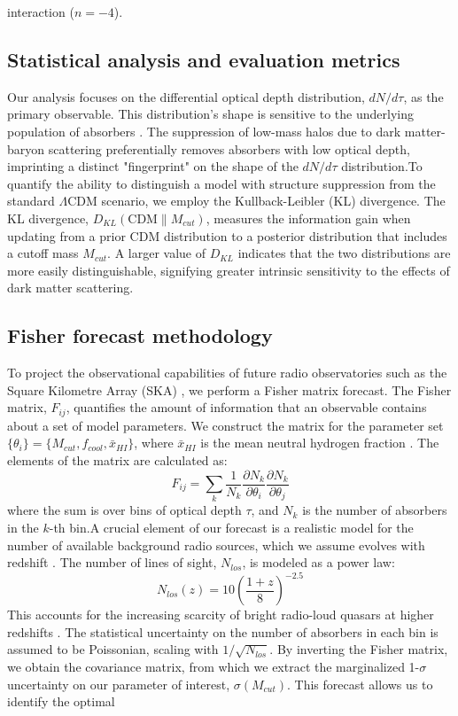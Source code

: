 \documentclass[]{article}
\begin{document}
interaction ($n=-4$).\subsection{Statistical analysis and evaluation metrics}Our analysis focuses on the differential optical depth distribution, $dN/d\tau$, as the primary observable. This distribution's shape is sensitive to the underlying population of absorbers \citep{kadota2023boosting21cmforest,ganguly2024edgesdarkforestnew}. The suppression of low-mass halos due to dark matter-baryon scattering preferentially removes absorbers with low optical depth, imprinting a distinct "fingerprint" on the shape of the $dN/d\tau$ distribution.To quantify the ability to distinguish a model with structure suppression from the standard $\Lambda$CDM scenario, we employ the Kullback-Leibler (KL) divergence. The KL divergence, $D_{KL}(\text{CDM} \parallel M_{cut})$, measures the information gain when updating from a prior CDM distribution to a posterior distribution that includes a cutoff mass $M_{cut}$. A larger value of $D_{KL}$ indicates that the two distributions are more easily distinguishable, signifying greater intrinsic sensitivity to the effects of dark matter scattering.\subsection{Fisher forecast methodology}To project the observational capabilities of future radio observatories such as the Square Kilometre Array (SKA) \citep{lazio2009squarekilometrearray,aharonian2013pathwaysquarekilometrearray}, we perform a Fisher matrix forecast. The Fisher matrix, $F_{ij}$, quantifies the amount of information that an observable contains about a set of model parameters. We construct the matrix for the parameter set $\{\theta_i\} = \{M_{cut}, f_{cool}, \bar{x}_{HI}\}$, where $\bar{x}_{HI}$ is the mean neutral hydrogen fraction \citep{li2025exploringhigalaxyredshift}. The elements of the matrix are calculated as:\begin{equation}F_{ij} = \sum_{k} \frac{1}{N_k} \frac{\partial N_k}{\partial \theta_i} \frac{\partial N_k}{\partial \theta_j}\end{equation}where the sum is over bins of optical depth $\tau$, and $N_k$ is the number of absorbers in the $k$-th bin.A crucial element of our forecast is a realistic model for the number of available background radio sources, which we assume evolves with redshift \citep{massardi2010modelcosmologicalevolutionlow}. The number of lines of sight, $N_{los}$, is modeled as a power law:\begin{equation}N_{los}(z) = 10 \left( \frac{1+z}{8} \right)^{-2.5}\end{equation}This accounts for the increasing scarcity of bright radio-loud quasars at higher redshifts \citep{zhang2025configurationrequirements21cmforest}. The statistical uncertainty on the number of absorbers in each bin is assumed to be Poissonian, scaling with $1/\sqrt{N_{los}}$. By inverting the Fisher matrix, we obtain the covariance matrix, from which we extract the marginalized 1-$\sigma$ uncertainty on our parameter of interest, $\sigma(M_{cut})$. This forecast allows us to identify the optimal 
\end{document}
